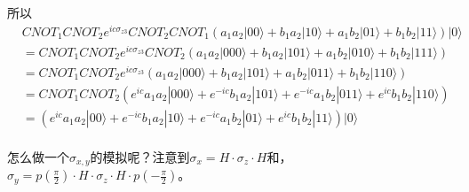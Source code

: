 所以
\begin{equation}
\begin{split}
&CNOT_1 CNOT_2 e^{ic\sigma _{z3}}  CNOT_2 CNOT_1 \left(a_1 a_2|00\rangle + b_1 a_2|10\rangle + a_1b_2|01\rangle + b_1b_2|11\rangle\right)|0\rangle \\
&= CNOT_1 CNOT_2 e^{ic\sigma _{z3}}  CNOT_2 \left(a_1 a_2|000\rangle + b_1 a_2|101\rangle + a_1b_2|010\rangle + b_1b_2|111\rangle\right)\\
&= CNOT_1 CNOT_2 e^{ic\sigma _{z3}}  \left(a_1 a_2|000\rangle + b_1 a_2|101\rangle + a_1b_2|011\rangle + b_1b_2|110\rangle\right)\\
&= CNOT_1 CNOT_2  \left(e^{ic}a_1 a_2|000\rangle + e^{-ic}b_1 a_2|101\rangle + e^{-ic}a_1b_2|011\rangle + e^{ic}b_1b_2|110\rangle\right)\\
&= \left(e^{ic}a_1 a_2|00\rangle + e^{-ic}b_1 a_2|10\rangle + e^{-ic}a_1b_2|01\rangle + e^{ic}b_1b_2|11\rangle\right)|0\rangle\\
\end{split}
\end{equation}


怎么做一个$\sigma _{x,y}$的模拟呢？注意到$\sigma _x = H\cdot \sigma _z \cdot H$和，$\sigma _y = p(\frac{\pi}{2})\cdot H\cdot \sigma _z \cdot H \cdot p(-\frac{\pi}{2})$。